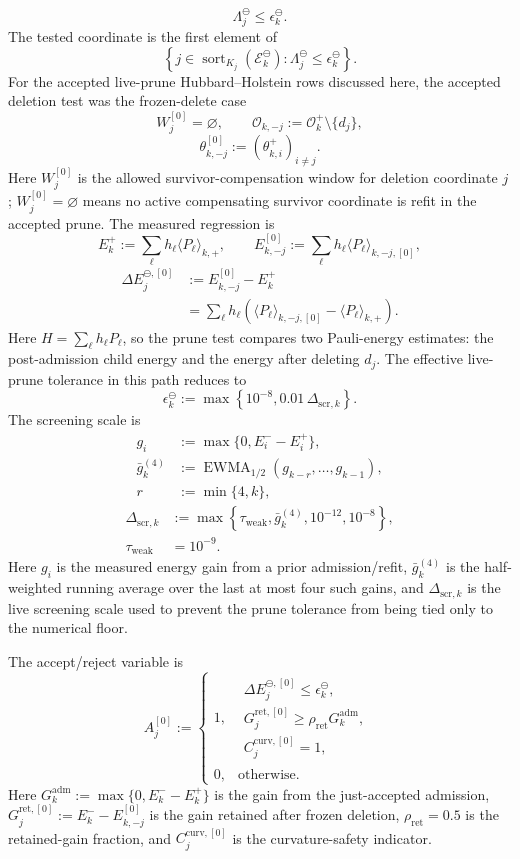 \documentclass[
  reprint,
  amsmath,
  amssymb,
  aps,
  pra,
  nofootinbib,
  superscriptaddress,
  floatfix
]{revtex4-2}
\begin{document}
\[
\Lambda_j^{\ominus}\le \epsilon_k^{\ominus}.
\]
The tested coordinate is the first element of
\[
\left\{
j\in \operatorname{sort}_{K_j}(\mathcal E_k^{\ominus})
:
\Lambda_j^{\ominus}\le \epsilon_k^{\ominus}
\right\}.
\]
For the accepted live-prune Hubbard--Holstein rows discussed here, the accepted deletion test was the frozen-delete case
\[
W_j^{[0]}=\varnothing,
\qquad
\mathcal O_{k,-j}:=\mathcal O_k^+\setminus\{d_j\},
\]
\[
\theta_{k,-j}^{[0]}:=(\theta_{k,i}^+)_{i\ne j}.
\]
Here \(W_j^{[0]}\) is the allowed survivor-compensation window for deletion coordinate \(j\); \(W_j^{[0]}=\varnothing\) means no active compensating survivor coordinate is refit in the accepted prune.  The measured regression is
\[
E_k^+
:=
\sum_{\ell}h_\ell\langle P_\ell\rangle_{k,+},
\qquad
E_{k,-j}^{[0]}
:=
\sum_{\ell}h_\ell\langle P_\ell\rangle_{k,-j,[0]},
\]
\[
\begin{aligned}
\Delta E_j^{\ominus,[0]}
&:=
E_{k,-j}^{[0]}-E_k^+
\\
&=
\sum_{\ell}h_\ell
\left(
\langle P_\ell\rangle_{k,-j,[0]}
-
\langle P_\ell\rangle_{k,+}
\right).
\end{aligned}
\]
Here \(H=\sum_\ell h_\ell P_\ell\), so the prune test compares two Pauli-energy estimates: the post-admission child energy and the energy after deleting \(d_j\).  The effective live-prune tolerance in this path reduces to
\[
\epsilon_k^{\ominus}
:=
\max\left\{
10^{-8},
0.01\,\Delta_{\mathrm{scr},k}
\right\}.
\]
The screening scale is
\[
\begin{aligned}
g_i
&:=
\max\{0,E_i^- - E_i^+\},
\\
\bar g_k^{(4)}
&:=
\operatorname{EWMA}_{1/2}
(g_{k-r},\ldots,g_{k-1}),
\\
r&:=\min\{4,k\},
\end{aligned}
\]
\[
\begin{aligned}
\Delta_{\mathrm{scr},k}
&:=
\max\left\{
\tau_{\mathrm{weak}},
\bar g_k^{(4)},
10^{-12},
10^{-8}
\right\},
\\
\tau_{\mathrm{weak}}&=10^{-9}.
\end{aligned}
\]
Here \(g_i\) is the measured energy gain from a prior admission/refit, \(\bar g_k^{(4)}\) is the half-weighted running average over the last at most four such gains, and \(\Delta_{\mathrm{scr},k}\) is the live screening scale used to prevent the prune tolerance from being tied only to the numerical floor.

The accept/reject variable is
\[
A_j^{[0]}
:=
\begin{cases}
1,
&
\begin{array}{l}
\Delta E_j^{\ominus,[0]}\le \epsilon_k^{\ominus},
\\
G_j^{\mathrm{ret},[0]}\ge \rho_{\mathrm{ret}}G_k^{\mathrm{adm}},
\\
C_j^{\mathrm{curv},[0]}=1,
\end{array}
\\[2ex]
0,
&
\text{otherwise}.
\end{cases}
\]
Here \(G_k^{\mathrm{adm}}:=\max\{0,E_k^- - E_k^+\}\) is the gain from the just-accepted admission, \(G_j^{\mathrm{ret},[0]}:=E_k^- - E_{k,-j}^{[0]}\) is the gain retained after frozen deletion, \(\rho_{\mathrm{ret}}=0.5\) is the retained-gain fraction, and \(C_j^{\mathrm{curv},[0]}\) is the curvature-safety indicator.
\end{document}
